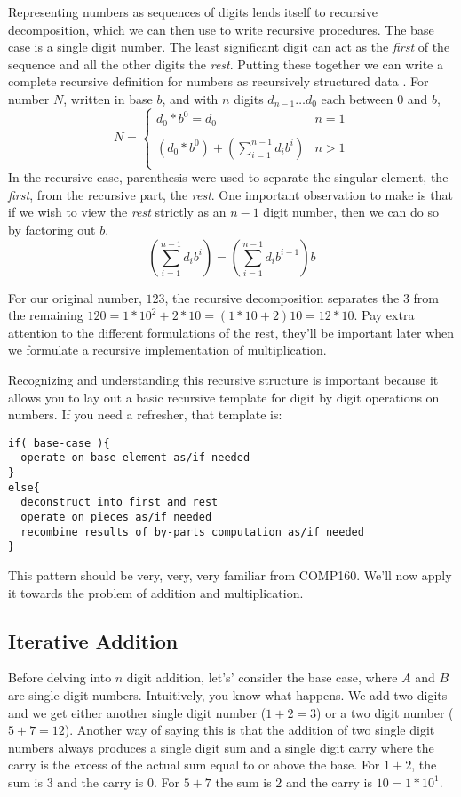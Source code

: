 \documentclass[10pt]{article}
\begin{document}
Representing numbers as sequences of digits lends itself to recursive decomposition, which we can then use to write recursive procedures. The base case is a single digit number. The least significant digit can act as the \textit{first} of the sequence and all the other digits the \textit{rest}. Putting these together we can write a complete recursive definition for numbers as recursively structured data . For number $N$, written in base $b$, and with $n$ digits $d_{n-1}\ldots d_{0}$ each between $0$ and $b$,
\[
N = \left\{
\begin{array}{ll}
d_0*b^0 = d_0  & n = 1 \\ \\
(d_{0}*b^{0}) + \left(\sum\limits_{i=1}^{n-1}d_ib^{i}\right) & n > 1 \\
\end{array}
\right.
\]
In the recursive case, parenthesis were used to separate the singular element, the \textit{first}, from the recursive part, the \textit{rest}. One important observation to make is that if we wish to view the \textit{rest} strictly as an $n-1$ digit number, then we can do so by factoring out $b$.
\[
\left(\sum\limits_{i=1}^{n-1}d_ib^{i}\right) = \left(\sum\limits_{i=1}^{n-1}d_ib^{i-1}\right)b
\]

For our original number, $123$, the recursive decomposition separates the $3$ from the remaining $120 = 1*10^2 + 2*10 = (1*10 + 2)10 = 12*10$. Pay extra attention to the different formulations of the rest, they'll be important later when we formulate a recursive implementation of multiplication.

Recognizing and understanding this recursive structure is important because it allows you to lay out a basic recursive template for digit by digit operations on numbers. If you need a refresher, that template is: 
\begin{verbatim}
if( base-case ){
  operate on base element as/if needed
}
else{
  deconstruct into first and rest  
  operate on pieces as/if needed
  recombine results of by-parts computation as/if needed
}
\end{verbatim}
This pattern should be very, very, very familiar from COMP160. We'll now apply it towards the problem of addition and multiplication. 

\subsection*{Iterative Addition}

Before delving into $n$ digit addition, let's' consider the base case, where $A$ and $B$ are single digit numbers. Intuitively, you know what happens. We add two digits and we get either another single digit number ($1+2=3$) or a two digit number ($5+7=12$). Another way of saying this is that the addition of two single digit numbers always produces a single digit sum and a single digit carry where the carry is the excess of the actual sum equal to or above the base. For $1+2$, the sum is $3$ and the carry is $0$. For $5+7$ the sum is $2$ and the carry is $10 = 1 * 10^1$.  
\end{document}
